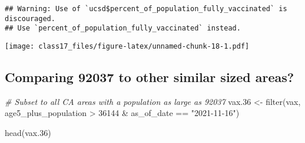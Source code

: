 \documentclass[
]{article}
\newenvironment{Shaded}{\begin{snugshade}}{\end{snugshade}}
\newcommand{\CommentTok}[1]{\textcolor[rgb]{0.56,0.35,0.01}{\textit{#1}}}
\newcommand{\DecValTok}[1]{\textcolor[rgb]{0.00,0.00,0.81}{#1}}
\newcommand{\FloatTok}[1]{\textcolor[rgb]{0.00,0.00,0.81}{#1}}
\newcommand{\FunctionTok}[1]{\textcolor[rgb]{0.00,0.00,0.00}{#1}}
\newcommand{\NormalTok}[1]{#1}
\newcommand{\OtherTok}[1]{\textcolor[rgb]{0.56,0.35,0.01}{#1}}
\newcommand{\SpecialCharTok}[1]{\textcolor[rgb]{0.00,0.00,0.00}{#1}}
\newcommand{\StringTok}[1]{\textcolor[rgb]{0.31,0.60,0.02}{#1}}
\begin{document}
\begin{verbatim}
## Warning: Use of `ucsd$percent_of_population_fully_vaccinated` is discouraged.
## Use `percent_of_population_fully_vaccinated` instead.
\end{verbatim}

\texttt{[image: class17\_files/figure-latex/unnamed-chunk-18-1.pdf]}

\hypertarget{comparing-92037-to-other-similar-sized-areas}{%
\subsection{Comparing 92037 to other similar sized
areas?}\label{comparing-92037-to-other-similar-sized-areas}}

\begin{Shaded}
\begin{Highlighting}[]
\CommentTok{\# Subset to all CA areas with a population as large as 92037}
\NormalTok{vax}\FloatTok{.36} \OtherTok{\textless{}{-}} \FunctionTok{filter}\NormalTok{(vax, age5\_plus\_population }\SpecialCharTok{\textgreater{}} \DecValTok{36144} \SpecialCharTok{\&}
\NormalTok{                as\_of\_date }\SpecialCharTok{==} \StringTok{"2021{-}11{-}16"}\NormalTok{)}

\FunctionTok{head}\NormalTok{(vax}\FloatTok{.36}\NormalTok{)}
\end{Highlighting}
\end{Shaded}
\end{document}
